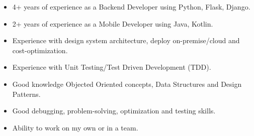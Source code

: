 

\begin{cvparagraph}

    \begin{itemize}
        \item {4+ years of experience as a Backend Developer using Python, Flask, Django.}
        \item {2+ years of experience as a Mobile Developer using Java, Kotlin.}
        \item {Experience with design system architecture, deploy on-premise/cloud and cost-optimization.}
        \item {Experience with Unit Testing/Test Driven Development (TDD).}
        \item {Good knowledge Objected Oriented concepts, Data Structures and Design Patterns.}
        \item {Good debugging, problem-solving, optimization and testing skills.}
        \item {Ability to work on my own or in a team.}
    \end{itemize}

\end{cvparagraph}
